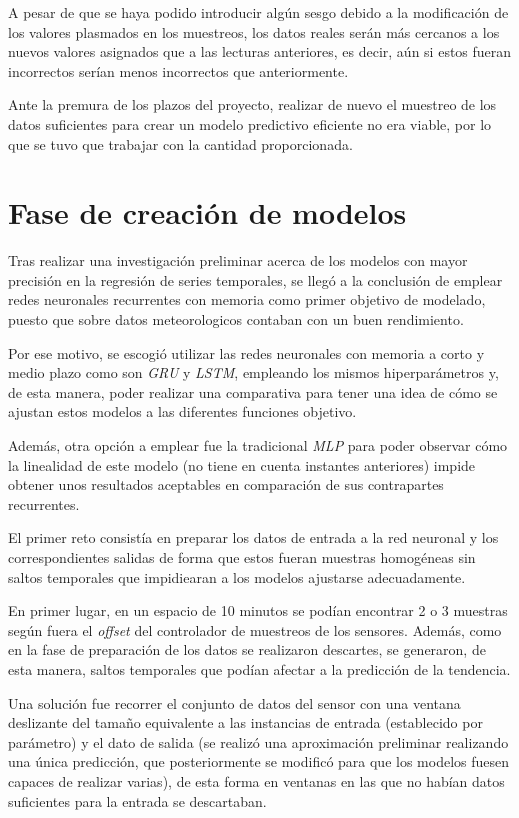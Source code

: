 A pesar de que se haya podido introducir algún sesgo debido a la modificación de los valores plasmados en los muestreos, 
los datos reales serán más cercanos a los nuevos valores asignados que a las lecturas anteriores, es decir, aún si 
estos fueran incorrectos serían menos incorrectos que anteriormente.

Ante la premura de los plazos del proyecto, realizar de nuevo el muestreo de los datos suficientes para crear un modelo predictivo
eficiente no era viable, por lo que se tuvo que trabajar con la cantidad proporcionada.

\section{Fase de creación de modelos}
Tras realizar una investigación preliminar acerca de los modelos con mayor precisión 
en la regresión de series temporales, se llegó a la conclusión de emplear
redes neuronales recurrentes con memoria como primer objetivo de modelado, 
puesto que sobre datos meteorologicos contaban con un buen rendimiento.

Por ese motivo, se escogió utilizar las redes neuronales con memoria a corto y medio
plazo como son \textit{GRU} y \textit{LSTM}, empleando los mismos hiperparámetros y,
de esta manera, poder realizar una comparativa para tener una idea de cómo se 
ajustan estos modelos a las diferentes funciones objetivo.

Además, otra opción a emplear fue la tradicional \textit{MLP} para poder observar
cómo la linealidad de este modelo (no tiene en cuenta instantes anteriores) impide obtener unos 
resultados aceptables en comparación de sus contrapartes recurrentes.

El primer reto consistía en preparar los datos de entrada a la red neuronal y los 
correspondientes salidas de forma que estos fueran muestras homogéneas
sin saltos temporales que impidiearan a los modelos ajustarse adecuadamente.

En primer lugar, en un espacio de 10 minutos se podían encontrar 2 o 3 muestras según fuera 
el \textit{offset} del controlador de muestreos de los sensores.
Además, como en la fase de preparación de los datos se realizaron descartes, se generaron, de esta manera,
saltos temporales que podían afectar a la predicción de la tendencia.

Una solución fue recorrer el conjunto de datos del sensor con una ventana deslizante del tamaño
equivalente a las instancias de entrada (establecido por parámetro) y el dato de salida (se realizó una 
aproximación preliminar realizando una única predicción, que posteriormente se modificó para 
que los modelos fuesen capaces de realizar varias), de esta forma en ventanas en las que 
no habían datos suficientes para la entrada se descartaban.

